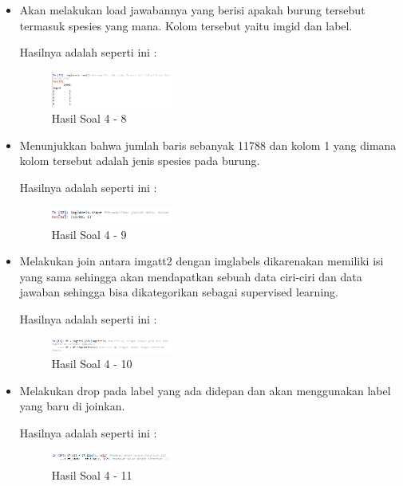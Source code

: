 \begin{enumerate}
\begin{itemize}
	\item Akan melakukan load jawabannya yang berisi apakah burung tersebut termasuk spesies yang mana. Kolom tersebut yaitu imgid dan label.
	
	Hasilnya adalah seperti ini :

	\begin{figure}[H]
	\centering
		\includegraphics[width=4cm]{figures/1174009/tugas3/materi/8.PNG}
		\caption{Hasil Soal 4 - 8}
	\end{figure}

	\item Menunjukkan bahwa jumlah baris sebanyak 11788 dan kolom 1 yang dimana kolom tersebut adalah jenis spesies pada burung.
	
	Hasilnya adalah seperti ini :

	\begin{figure}[H]
	\centering
		\includegraphics[width=4cm]{figures/1174009/tugas3/materi/9.PNG}
		\caption{Hasil Soal 4 - 9}
	\end{figure}

	\item Melakukan join antara imgatt2 dengan imglabels dikarenakan memiliki isi yang sama sehingga akan mendapatkan sebuah data ciri-ciri dan data jawaban sehingga bisa dikategorikan sebagai supervised learning.
	
	Hasilnya adalah seperti ini :

	\begin{figure}[H]
	\centering
		\includegraphics[width=4cm]{figures/1174009/tugas3/materi/10.PNG}
		\caption{Hasil Soal 4 - 10}
	\end{figure}

	\item Melakukan drop pada label yang ada didepan dan akan menggunakan label yang baru di joinkan.
	
	Hasilnya adalah seperti ini :

	\begin{figure}[H]
	\centering
		\includegraphics[width=4cm]{figures/1174009/tugas3/materi/11.PNG}
		\caption{Hasil Soal 4 - 11}
	\end{figure}


\end{itemize}
\end{enumerate}
